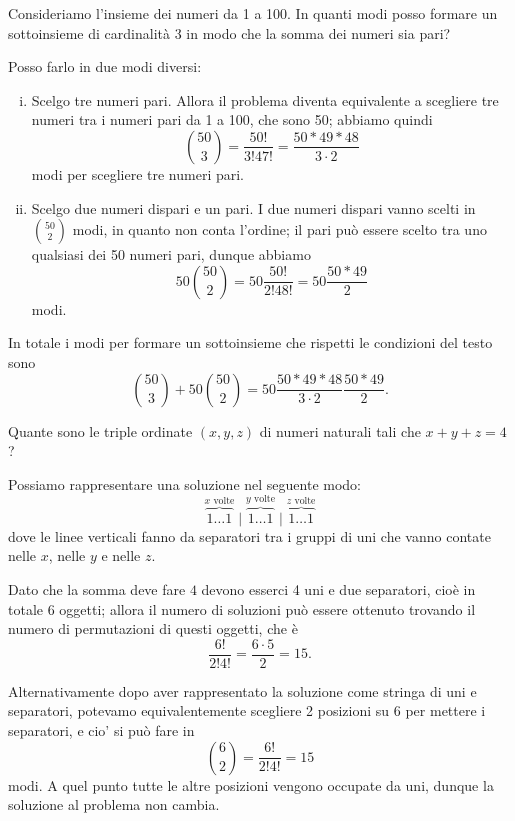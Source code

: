 \begin{example}
    Consideriamo l'insieme dei numeri da 1 a 100. In quanti modi posso formare un sottoinsieme di cardinalità 3 in modo che la somma dei numeri sia pari?
\end{example}
\begin{solution}
    Posso farlo in due modi diversi:
    \begin{enumerate}[(i)]
        \item Scelgo tre numeri pari. Allora il problema diventa equivalente a scegliere tre numeri tra i numeri pari da 1 a 100, che sono 50; abbiamo quindi \[
            \binom{50}{3} = \frac{50!}{3!47!} = \frac{50 * 49 * 48}{3 \cdot 2}   
        \] modi per scegliere tre numeri pari.
        \item Scelgo due numeri dispari e un pari. I due numeri dispari vanno scelti in $\binom{50}{2}$ modi, in quanto non conta l'ordine; il pari può essere scelto tra uno qualsiasi dei 50 numeri pari, dunque abbiamo \[
            50\binom{50}{2} = 50\frac{50!}{2!48!} = 50\frac{50 * 49}{2}
        \] modi.
    \end{enumerate}
    In totale i modi per formare un sottoinsieme che rispetti le condizioni del testo sono \[
        \binom{50}{3} + 50\binom{50}{2} = 50\frac{50 * 49 * 48}{3 \cdot 2}\frac{50 * 49}{2}.           
    \]
\end{solution}

\begin{example}
    Quante sono le triple ordinate $(x, y , z)$ di numeri naturali tali che $x + y + z = 4$?
\end{example}
\begin{solution}
    Possiamo rappresentare una soluzione nel seguente modo:
    \[
        \overbrace{1 \dots 1}^{x \text{ volte}} \mid   \overbrace{1 \dots 1}^{y \text{ volte}} \mid\overbrace{1 \dots 1}^{z \text{ volte}}
    \] dove le linee verticali fanno da separatori tra i gruppi di uni che vanno contate nelle $x$, nelle $y$ e nelle $z$. 
    
    Dato che la somma deve fare $4$ devono esserci 4 uni e due separatori, cioè in totale 6 oggetti; allora il numero di soluzioni può essere ottenuto trovando il numero di permutazioni di questi oggetti, che è \[
        \frac{6!}{2!4!} = \frac{6 \cdot 5}{2} = 15.
    \]

    Alternativamente dopo aver rappresentato la soluzione come stringa di uni e separatori, potevamo equivalentemente scegliere 2 posizioni su 6 per mettere i separatori, e cio' si può fare in \[
        \binom{6}{2} = \frac{6!}{2!4!} = 15    
    \] modi. A quel punto tutte le altre posizioni vengono occupate da uni, dunque la soluzione al problema non cambia.
\end{solution}

